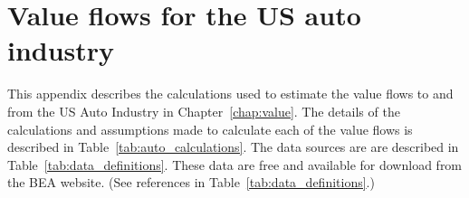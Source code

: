 %
%
%
\chapter{Value flows for the US auto industry}
\label{chap:auto_value_flows} 


This appendix describes the calculations used 
to estimate the value flows to and from the US Auto Industry  
in Chapter~\ref{chap:value}.  
The details of the calculations and assumptions made to calculate 
each of the value flows is described in Table~\ref{tab:auto_calculations}. 
The data sources are are described in Table~\ref{tab:data_definitions}. 
These data are free and available for download 
from the BEA website.
(See references in Table~\ref{tab:data_definitions}.)

